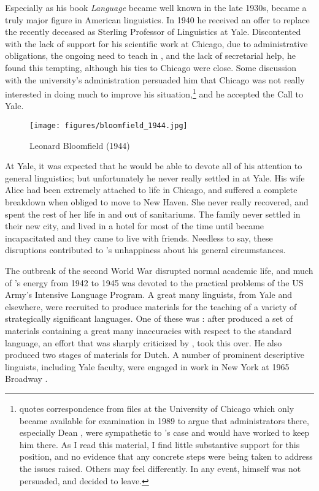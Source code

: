 Especially as his book \textsl{Language} \citep{bloomfield:lg} became
well known in the late 1930s, {\Bloomfield} became a truly major figure
in American linguistics. In 1940 he received an offer to replace the
recently deceased {\Sapir} as Sterling Professor of Linguistics at
Yale. Discontented with the lack of support for his scientific work at
Chicago, due to administrative obligations, the ongoing need to teach
in , and the lack of secretarial help, he found this tempting,
although his ties to Chicago were close. Some discussion with the
university's administration persuaded him that Chicago was not really
interested in doing much to improve his
situation,\footnote{\citet[59ff.]{hall90:bloomfield.bio} quotes
  correspondence from files at the University of Chicago which only
  became available for examination in 1989 to argue that
  administrators there, especially Dean , were
  sympathetic to {\Bloomfield}'s case and would have worked to keep him
  there. As I read this material, I find little substantive support
  for this position, and no evidence that any concrete steps were
  being taken to address the issues {\Bloomfield} raised. Others may feel
  differently. In any event, {\Bloomfield} himself was not persuaded, and
  decided to leave.} and he accepted the Call to Yale.

\begin{wrapfigure}{r}{.4\textwidth}
  \texttt{[image: figures/bloomfield\_1944.jpg]}
  \caption{Leonard Bloomfield (1944)}
  \label{fig:ch.bloomfield.bloomfield_1944}
\end{wrapfigure}
At Yale, it was expected that he would be able to devote all of his
attention to general linguistics; but unfortunately he never really
settled in at Yale. His wife Alice had been extremely attached to life
in Chicago, and suffered a complete breakdown when obliged to move to
New Haven. She never really recovered, and spent the rest of her life
in and out of sanitariums. The family never settled in their new city,
and lived in a hotel for most of the time until {\Bloomfield} became
incapacitated and they came to live with friends. Needless to say,
these disruptions contributed to {\Bloomfield}'s unhappiness about his
general circumstances.

The outbreak of the second World War disrupted normal academic life,
and much of {\Bloomfield}'s energy from 1942 to 1945 was devoted to the
practical problems of the US Army's Intensive Language Program. A
great many linguists, from Yale and elsewhere, were recruited to
produce materials for the teaching of a variety of strategically
significant languages. One of these was : after {\Trager} produced
a set of materials containing a great many inaccuracies with respect
to the standard language, an effort that was sharply criticized by
{\Jakobson}, {\Bloomfield} took this over. He also produced two stages of
materials for Dutch. A number of prominent descriptive linguists,
including Yale faculty, were engaged in work in New York at 1965
Broadway \citep{hall91:165broadway}.

